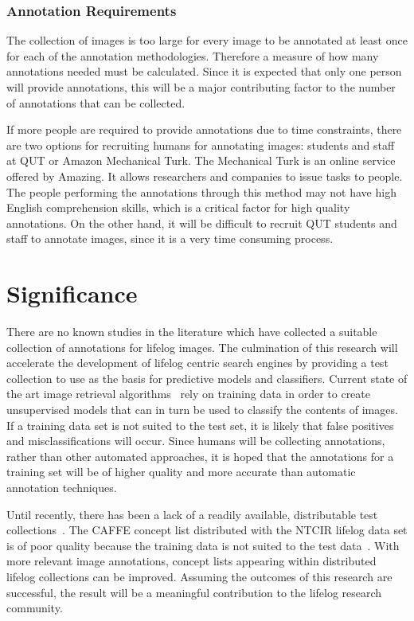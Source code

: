 \documentclass[12pt,a4paper]{article}
\begin{document}
\subsubsection{Annotation Requirements}
The collection of images is too large for every image to be annotated at least once for each of the annotation methodologies. Therefore a measure of how many annotations needed must be calculated. Since it is expected that only one person will provide annotations, this will be a major contributing factor to the number of annotations that can be collected.

If more people are required to provide annotations due to time constraints, there are two options for recruiting humans for annotating images: students and staff at QUT or Amazon Mechanical Turk. The Mechanical Turk is an online service offered by Amazing. It allows researchers and companies to issue tasks to people. The people performing the annotations through this method may not have high English comprehension skills, which is a critical factor for high quality annotations. On the other hand, it will be difficult to recruit QUT students and staff to annotate images, since it is a very time consuming process.

\section{Significance}
There are no known studies in the literature which have collected a suitable collection of annotations for lifelog images. The culmination of this research will accelerate the development of lifelog centric search engines by providing a test collection to use as the basis for predictive models and classifiers. Current state of the art image retrieval algorithms~\cite{karpathy2015deep} rely on training data in order to create unsupervised models that can in turn be used to classify the contents of images. If a training data set is not suited to the test set, it is likely that false positives and misclassifications will occur. Since humans will be collecting annotations, rather than other automated approaches, it is hoped that the annotations for a training set will be of higher quality and more accurate than automatic annotation techniques. 

Until recently, there has been a lack of a readily available, distributable test collections~\cite{gurrin2014lifelogging}. The CAFFE concept list distributed with the NTCIR lifelog data set is of poor quality because the training data is not suited to the test data~\cite{harry2016lifelog}. With more relevant image annotations, concept lists appearing within distributed lifelog collections can be improved. Assuming the outcomes of this research are successful, the result will be a meaningful contribution to the lifelog research community.
\end{document}
